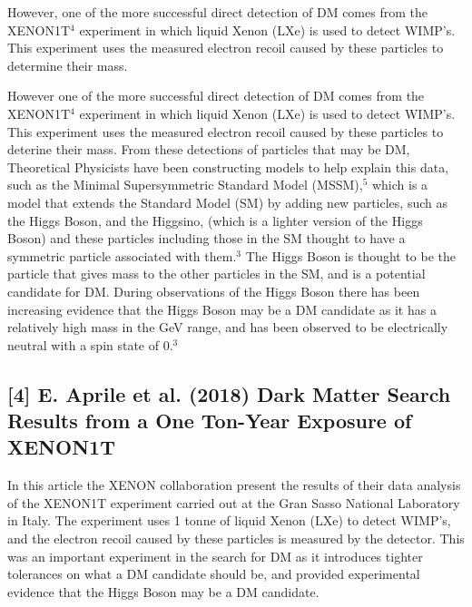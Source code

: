 \documentclass[]{article}
\begin{document}
\par
However, one of the more successful direct detection of DM comes from the 
XENON1T$^4$ experiment in which liquid Xenon (LXe) is used to detect WIMP's.
This experiment uses the measured electron recoil caused by these particles
to determine their mass. 
\par
\parskip 0.2cm
However one of the more successful direct detection of DM comes from the 
XENON1T$^4$ experiment in which liquid Xenon (LXe) is used to detect WIMP's.
This experiment uses the measured electron recoil caused by these particles
to deterine their mass. 
\parskip 0.2cm
From these detections of particles that may be DM, Theoretical Physicists have
been constructing models to help explain this data, such as the Minimal Supersymmetric
Standard Model (MSSM),$^5$ which is a model that extends the Standard Model (SM) by
adding new particles, such as the Higgs Boson, and the Higgsino, (which is a
lighter version of the Higgs Boson) and these particles including those in the SM 
thought to have a symmetric particle associated with them.$^3$ The Higgs Boson is thought to be the particle
that gives mass to the other particles in the SM, and is a potential 
candidate for DM. During observations of the Higgs Boson there has been increasing
evidence that the Higgs Boson may be a DM candidate
as it has a relatively high mass in the GeV range, and has been observed
to be electrically neutral with a spin state of 0.$^3$
\parskip 0.2cm
\newpage
\noindent 
\subsection*{[4] E. Aprile et al. (2018) Dark Matter Search Results from a One Ton-Year Exposure of XENON1T}

\parskip 0.2cm
In this article the XENON collaboration present the results of their data analysis
of the XENON1T experiment carried out at the Gran Sasso National Laboratory in Italy.
The experiment uses  1 tonne of liquid Xenon (LXe) to detect WIMP's, and the 
electron recoil caused by these particles is measured by the detector. This was an 
important experiment in the search for DM as it introduces tighter tolerances on what 
a DM candidate should be, and provided experimental evidence that the Higgs Boson
may be a DM candidate.\parskip 0.2cm

\noindent 
\end{document}
